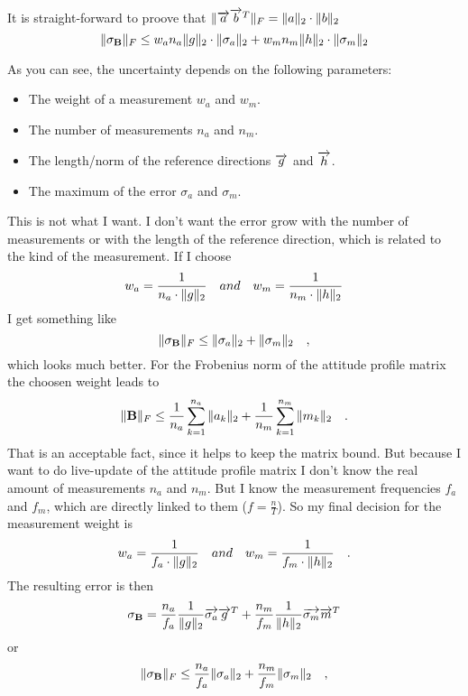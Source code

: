 It is straight-forward to proove that $ \Vert{\ensuremath{\overrightarrow{a}} \ensuremath{\overrightarrow{b}^{T}}}\Vert_F = \Vert{a}\Vert_2 \cdot \Vert{b}\Vert_2 $
\begin{equation}
\Vert{\ensuremath{\mathbf{\sigma_B}}}\Vert_{F} \le w_a n_a \Vert{g}\Vert_2 \cdot \Vert{\sigma_a}\Vert_2 + w_m n_m \Vert{h}\Vert_2 \cdot \Vert{\sigma_m}\Vert_2
\end{equation}

As you can see, the uncertainty depends on the following parameters:
\begin{itemize}
\item The weight of a measurement $w_a$ and $w_m$.
\item The number of measurements $n_a$ and $n_m$.
\item The length/norm of the reference directions $\overrightarrow{g}$ and $\overrightarrow{h}$.
\item The maximum of the error $\sigma_a$ and $\sigma_m$.
\end{itemize}

This is not what I want. I don't want the error grow with the number of measurements or with the length of the reference direction, which is related to the kind of the measurement. If I choose
\begin{equation}
w_a = \frac{1}{n_a \cdot \Vert{g}\Vert_2} \quad and \quad w_m = \frac{1}{n_m \cdot \Vert{h}\Vert_2}
\end{equation}
I get something like
\begin{equation}
\Vert{\ensuremath{\mathbf{\sigma_B}}}\Vert_{F} \le \Vert{\sigma_a}\Vert_2 + \Vert{\sigma_m}\Vert_2 \quad , 
\end{equation}
which looks much better. For the Frobenius norm of the attitude profile matrix the choosen weight leads to
\begin{equation}
\Vert{\ensuremath{\mathbf{B}}}\Vert_{F} \le \frac{1}{n_a} \sum_{k=1}^{n_a} \Vert{a_k}\Vert_2 + \frac{1}{n_m} \sum_{k=1}^{n_m} \Vert{m_k}\Vert_2	\quad .
\end{equation}
That is an acceptable fact, since it helps to keep the matrix bound.
But because I want to do live-update of the attitude profile matrix I don't know the real amount of measurements $n_a$ and $n_m$. But I know the measurement frequencies $f_a$ and $f_m$, which are directly linked to them ($f = \tfrac n T $). So my final decision for the measurement weight is
\begin{equation}
w_a = \frac{1}{f_a \cdot \Vert{g}\Vert_2} \quad and \quad w_m = \frac{1}{f_m \cdot \Vert{h}\Vert_2} \quad .
\end{equation}
The resulting error is then
\begin{equation}
\mathbf{\sigma_B} = \frac{n_a}{f_a} \frac{1}{\Vert{g}\Vert_2} \overrightarrow{\sigma_a}\overrightarrow{g}^{T} + \frac{n_m}{f_m} \frac{1}{\Vert{h}\Vert_2} \overrightarrow{\sigma_m}\overrightarrow{m}^{T}
\end{equation}
or
\begin{equation}
\Vert{\ensuremath{\mathbf{\sigma_B}}}\Vert_{F} \le \frac{n_a}{f_a} \Vert{\sigma_a}\Vert_2 + \frac{n_m}{f_m} \Vert{\sigma_m}\Vert_2 \quad , 
\end{equation}